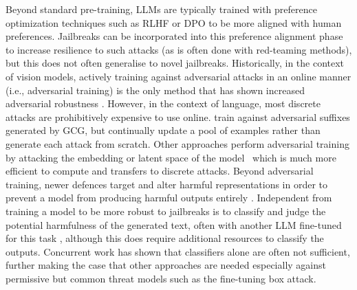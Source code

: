 Beyond standard pre-training, LLMs are typically trained with preference optimization techniques such as RLHF \citep{ouyang_training_2022} or DPO \citep{rafailov_direct_2023} to be more aligned with human preferences.
Jailbreaks can be incorporated into this preference alignment phase to increase resilience to such attacks (as is often done with red-teaming methods), but this does not often generalise to novel jailbreaks.
Historically, in the context of vision models, actively training against adversarial attacks in an online manner (i.e., adversarial training) is the only method that has shown increased adversarial robustness \citep{madry_towards_2017}. However, in the context of language, most discrete attacks are prohibitively expensive to use online. 
\citet{mazeika_harmbench_2024} train against adversarial suffixes generated by GCG, but continually update a pool of examples rather than generate each attack from scratch.
Other approaches perform adversarial training by attacking the embedding or latent space of the model~\citep{xhonneux_efficient_2024, sheshadri_latent_2024} which is much more efficient to compute and transfers to discrete attacks.
Beyond adversarial training, newer defences target and alter harmful representations in order to prevent a model from producing harmful outputs entirely \citep{zou_improving_2024}.
Independent from training a model to be more robust to jailbreaks is to classify and judge the potential harmfulness of the generated text, often with another LLM fine-tuned for this task \citep{inan_llama_2023, feuer_style_2024}, although this does require additional resources to classify the outputs. Concurrent work \citet{huang_virus_2025} has shown that classifiers alone are often not sufficient, further making the case that other approaches are needed especially against permissive but common threat models such as the fine-tuning box attack.


